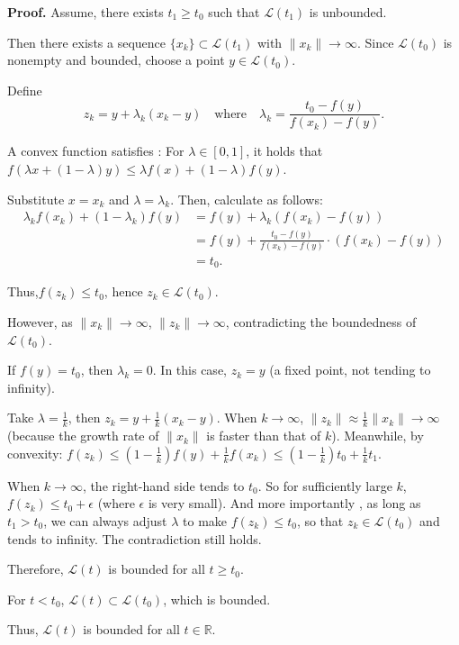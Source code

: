 \documentclass[a4paper, 11pt]{article}
\newenvironment{solution}
    {\textbf{Proof.}}
    {}
\begin{document}
\begin{solution}
	Assume, there exists \( t_1 \geq t_0 \) such that \( \mathcal{L}(t_1) \) is unbounded. 
	
	Then there exists a sequence \( \{x_k\} \subset \mathcal{L}(t_1) \) with \( \|x_k\| \to \infty \). 
	Since \( \mathcal{L}(t_0) \) is nonempty and bounded, choose a point \( y \in \mathcal{L}(t_0) \). 
	
	Define 
$$
	z_k = y + \lambda_k (x_k - y) \quad \text{where} \quad \lambda_k = \frac{t_0 - f(y)}{f(x_k) - f(y)}.
$$

A convex function satisfies : For \( \lambda \in [0, 1] \), it holds that \( f(\lambda x + (1 - \lambda)y) \leq \lambda f(x) + (1 - \lambda)f(y) \).  

Substitute \( x = x_k \) and \( \lambda = \lambda_k \). Then, calculate as follows:  
$$
\begin{align*}
	\lambda_k f(x_k) + (1 - \lambda_k)f(y) &= f(y) + \lambda_k \left( f(x_k) - f(y) \right) \\
	&= f(y) + \frac{t_0 - f(y)}{f(x_k) - f(y)} \cdot \left( f(x_k) - f(y) \right) \\
	&= t_0.
\end{align*}
$$

Thus,\( f(z_k) \leq t_0 \), hence \( z_k \in \mathcal{L}(t_0) \).
	
However, as \( \|x_k\| \to \infty \), \( \|z_k\| \to \infty \), contradicting the boundedness of \( \mathcal{L}(t_0) \). 

If \( f(y) = t_0 \), then \( \lambda_k = 0 \). In this case, \( z_k = y \) (a fixed point, not tending to infinity).  

Take \( \lambda = \frac{1}{k} \), then \( z_k = y + \frac{1}{k}(x_k - y) \). When \( k \to \infty \), \( \| z_k \| \approx \frac{1}{k}\| x_k \| \to \infty \) (because the growth rate of \( \| x_k \| \) is faster than that of \( k \)). Meanwhile, by convexity: \( f(z_k) \leq \left(1 - \frac{1}{k}\right)f(y) + \frac{1}{k}f(x_k) \leq \left(1 - \frac{1}{k}\right)t_0 + \frac{1}{k}t_1 \).  

When \( k \to \infty \), the right-hand side tends to \( t_0 \). So for sufficiently large \( k \), \( f(z_k) \leq t_0 + \epsilon \) (where \( \epsilon \) is very small). And more importantly , as long as \( t_1 > t_0 \), we can always adjust \( \lambda \) to make \( f(z_k) \leq t_0 \), so that \( z_k \in \mathcal{L}(t_0) \) and tends to infinity. The contradiction still holds.  

Therefore, \( \mathcal{L}(t) \) is bounded for all \( t \geq t_0 \). 
	
For \( t < t_0 \), \( \mathcal{L}(t) \subset \mathcal{L}(t_0) \), which is bounded. 
	
Thus, \( \mathcal{L}(t) \) is bounded for all \( t \in \mathbb{R} \).

\end{solution}
\end{document}
